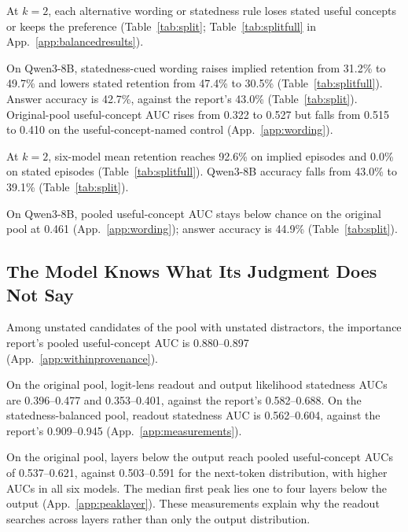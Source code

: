 At $k=2$, each alternative wording or statedness rule loses stated useful concepts or keeps the preference (Table~\ref{tab:split}; Table~\ref{tab:splitfull} in App.~\ref{app:balancedresults}).


On Qwen3-8B, statedness-cued wording raises implied retention from 31.2\% to 49.7\% and lowers stated retention from 47.4\% to 30.5\% (Table~\ref{tab:splitfull}). Answer accuracy is 42.7\%, against the report's 43.0\% (Table~\ref{tab:split}). Original-pool useful-concept AUC rises from 0.322 to 0.527 but falls from 0.515 to 0.410 on the useful-concept-named control (App.~\ref{app:wording}).

At $k=2$, six-model mean retention reaches 92.6\% on implied episodes and 0.0\% on stated episodes (Table~\ref{tab:splitfull}). Qwen3-8B accuracy falls from 43.0\% to 39.1\% (Table~\ref{tab:split}).

On Qwen3-8B, pooled useful-concept AUC stays below chance on the original pool at 0.461 (App.~\ref{app:wording}); answer accuracy is 44.9\% (Table~\ref{tab:split}).

\subsection{The Model Knows What Its Judgment Does Not Say}\label{sec:knowledge}

Among unstated candidates of the pool with unstated distractors, the importance report's pooled useful-concept AUC is 0.880--0.897 (App.~\ref{app:withinprovenance}).

On the original pool, logit-lens readout and output likelihood statedness AUCs are 0.396--0.477 and 0.353--0.401, against the report's 0.582--0.688. On the statedness-balanced pool, readout statedness AUC is 0.562--0.604, against the report's 0.909--0.945 (App.~\ref{app:measurements}).

On the original pool, layers below the output reach pooled useful-concept AUCs of 0.537--0.621, against 0.503--0.591 for the next-token distribution, with higher AUCs in all six models. The median first peak lies one to four layers below the output (App.~\ref{app:peaklayer}). These measurements explain why the readout searches across layers rather than only the output distribution.

